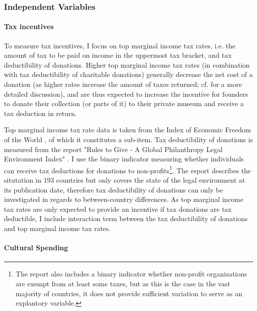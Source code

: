 \documentclass[11pt]{article}
\begin{document}
\subsubsection*{Independent Variables}

\paragraph*{Tax incentives}

To measure tax incentives, I focus on top marginal income tax rates, i.e. the amount of tax to be paid on income in the uppermost tax bracket, and tax deductibility of donations.
Higher top marginal income tax rates (in combination with tax deductibility of charitable donations) generally decrease the net cost of a donation (as higher rates increase the amount of taxes returned; cf. \cite{Hemels_2017_incentives} for a more detailed discussion), and are thus expected to increase the incentive for founders to donate their collection (or parts of it) to their private museum and receive a tax deduction in return. 


Top marginal income tax rate data is taken from the Index of Economic Freedom of the World \parencite{Fraser_2022_economic_freedom}, of which it constitutes a sub-item.
Tax deductibility of donations is measured from the report "Rules to Give - A Global Philanthropy Legal Environment Index" \parencite{Quick_Kruse_Pickering_2014_philanthropy}.
I use the binary indicator measuring whether individuals can receive tax deductions for donations to non-profits\footnote{The report also includes a binary indicator whether non-profit organizations are exempt from at least some taxes, but as this is the case in the vast majority of countries, it does not provide sufficient variation to serve as an explantory variable.}.
The report describes the situtation in 193 countries but only covers the state of the legal environment at its publication date, therefore tax deductibility of donations can only be investigated in regards to between-country differences.
As top marginal income tax rates are only expected to provide an incentive if tax donations are tax deductible, I include interaction term between the tax deductibility of donations and top marginal income tax rates. 

\paragraph*{Cultural Spending}
\end{document}
